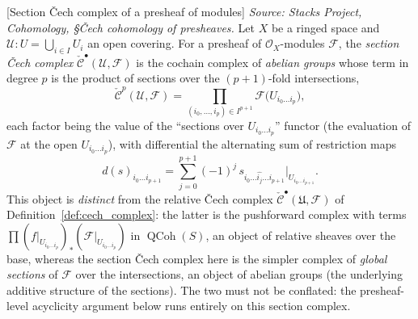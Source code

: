\begin{definition}

[Section {\v C}ech complex of a presheaf of modules]
  \label{def:section_cech_complex}
  \textit{Source: Stacks Project, Cohomology, \S{\v C}ech cohomology of presheaves.}
  Let \(X\) be a ringed space and \(\mathcal{U} : U = \bigcup_{i \in I} U_i\) an open
  covering. For a presheaf of \(\mathcal{O}_X\)-modules \(\mathcal{F}\), the
  \emph{section {\v C}ech complex} \(\check{\mathcal{C}}^\bullet(\mathcal{U},
  \mathcal{F})\) is the cochain complex of \emph{abelian groups} whose term in
  degree \(p\) is the product of sections over the \((p+1)\)-fold intersections,
  \[
    \check{\mathcal{C}}^p(\mathcal{U}, \mathcal{F})
      = \prod_{(i_0, \ldots, i_p) \in I^{p+1}}
        \mathcal{F}\bigl(U_{i_0 \ldots i_p}\bigr),
  \]
  each factor being the value of the ``sections over \(U_{i_0 \ldots i_p}\)'' functor
  (the evaluation of \(\mathcal{F}\) at the open \(U_{i_0 \ldots i_p}\)), with
  differential the alternating sum of restriction maps
  \[
    d(s)_{i_0 \ldots i_{p+1}}
      = \sum_{j=0}^{p+1} (-1)^j\,
        s_{i_0 \ldots \widehat{i_j} \ldots i_{p+1}}
        \big|_{U_{i_0 \ldots i_{p+1}}}.
  \]
  This object is \emph{distinct} from the relative {\v C}ech complex
  \(\check{\mathcal{C}}^\bullet(\mathfrak{U}, \mathcal{F})\) of
  Definition~\ref{def:cech_complex}: the latter is the pushforward complex with terms
  \(\prod (f|_{U_{i_0 \ldots i_p}})_*(\mathcal{F}|_{U_{i_0 \ldots i_p}})\) in
  \(\operatorname{QCoh}(S)\), an object of relative sheaves over the base, whereas the
  section {\v C}ech complex here is the simpler complex of \emph{global sections} of
  \(\mathcal{F}\) over the intersections, an object of abelian groups (the underlying
  additive structure of the sections). The two must not be conflated: the
  presheaf-level acyclicity argument below runs entirely on this section complex.
\end{definition}

